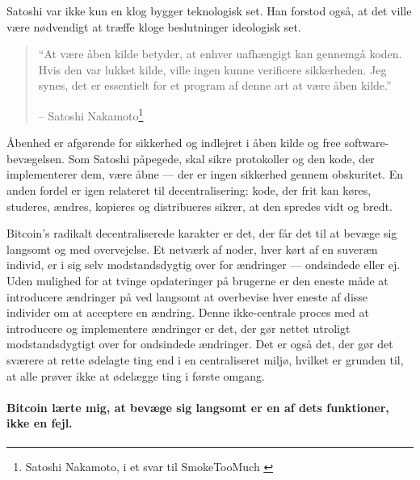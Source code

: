 Satoshi var ikke kun en klog bygger teknologisk set. Han forstod også, at det ville være nødvendigt at træffe kloge beslutninger ideologisk set.

\begin{quotation}\begin{samepage}
    \enquote{At være åben kilde betyder, at enhver uafhængigt kan gennemgå koden. Hvis
    den var lukket kilde, ville ingen kunne verificere sikkerheden. Jeg synes, det er
    essentielt for et program af denne art at være åben kilde.}
    \begin{flushright} -- Satoshi Nakamoto\footnote{Satoshi Nakamoto, i et svar til SmokeTooMuch \cite{satoshi-open-source}}
\end{flushright}\end{samepage}\end{quotation}

Åbenhed er afgørende for sikkerhed og indlejret i åben kilde og
free software-bevægelsen. Som Satoshi påpegede, skal sikre protokoller og
den kode, der implementerer dem, være åbne --- der er ingen sikkerhed
gennem obskuritet. En anden fordel er igen relateret til decentralisering:
kode, der frit kan køres, studeres, ændres, kopieres og distribueres
sikrer, at den spredes vidt og bredt.

Bitcoin's radikalt decentraliserede karakter er det, der får det til at bevæge sig
langsomt og med overvejelse. Et netværk af noder, hver kørt af en suveræn
individ, er i sig selv modstandsdygtig over for ændringer --- ondsindede eller ej. Uden
mulighed for at tvinge opdateringer på brugerne er den eneste måde at introducere ændringer på
ved langsomt at overbevise hver eneste af disse individer om at acceptere en
ændring. Denne ikke-centrale proces med at introducere og implementere ændringer er
det, der gør nettet utroligt modstandsdygtigt over for ondsindede ændringer. Det er
også det, der gør det sværere at rette ødelagte ting end i en
centraliseret miljø, hvilket er grunden til, at alle prøver ikke at ødelægge ting
i første omgang.

\paragraph{Bitcoin lærte mig, at bevæge sig langsomt er en af dets funktioner, ikke en
fejl.}

